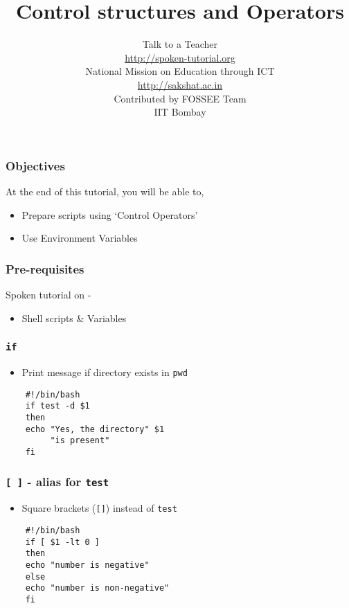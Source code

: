 \documentclass[17pt,compress]{beamer}
\author[FOSSEE]{}
\institute[IIT Bombay]{}
\date[]{}
\begin{document}
\sffamily \bfseries
\title
[Control structures and Operators]
{Control structures and Operators}
\author
[FOSSEE]
{\small Talk to a Teacher\\{\color{blue}\url{http://spoken-tutorial.org}}\\\vspace{0.25cm}National Mission on Education
 through ICT\\{\color{blue}\url{ http://sakshat.ac.in}} \\ [0.8cm]
   Contributed by FOSSEE Team \\IIT Bombay  \\[0.3cm]
}

\begin{frame}
   \titlepage
\end{frame}

\begin{frame}
\frametitle{Objectives}
\label{sec-2}

At the end of this tutorial, you will be able to,
\begin{itemize}
\item Prepare scripts using `Control Operators'
\item Use Environment Variables
\end{itemize}
\end{frame}

\begin{frame}
\frametitle{Pre-requisites}
\label{sec-3}

Spoken tutorial on -
\begin{itemize}
\item Shell scripts \& Variables
\end{itemize}
\end{frame}

\begin{frame}[fragile]
  \frametitle{\texttt{if}}
  \begin{itemize}
  \item Print message if directory exists in \texttt{pwd}
  \end{itemize}
  \begin{lstlisting}
    #!/bin/bash
    if test -d $1
    then
    echo "Yes, the directory" $1 
         "is present"
    fi
  \end{lstlisting} %
\end{frame}

\begin{frame}[fragile]
  \frametitle{\texttt{[ ]} - alias for \texttt{test}}
  \begin{itemize}
  \item Square brackets (\texttt{[]}) instead of \texttt{test}
  \end{itemize}
  \begin{lstlisting}
    #!/bin/bash
    if [ $1 -lt 0 ]
    then
    echo "number is negative"
    else
    echo "number is non-negative"
    fi
  \end{lstlisting} %
\end{frame}
\end{document}
